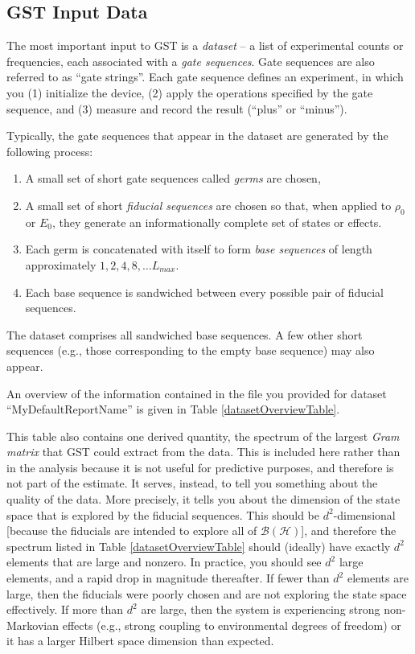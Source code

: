 \documentclass{article}[11pt]
\begin{document}
\subsection{GST Input Data}

The most important input to GST is a \emph{dataset} -- a list of experimental counts or frequencies, each associated with a \emph{gate sequences}.  Gate sequences are also referred to as ``gate strings''.  Each gate sequence defines an experiment, in which you (1) initialize the device, (2) apply the operations specified by the gate sequence, and (3) measure and record the result (``plus'' or ``minus'').

Typically, the gate sequences that appear in the dataset are generated by the following process:
\begin{enumerate}
\item A small set of short gate sequences called \emph{germs} are chosen,
\item A small set of short \emph{fiducial sequences} are chosen so that, when applied to $\rho_0$ or $E_0$, they generate an informationally complete set of states or effects.
\item Each germ is concatenated with itself to form \emph{base sequences} of length approximately $1,2,4,8,\ldots L_{max}$.
\item Each base sequence is sandwiched between every possible pair of fiducial sequences.
\end{enumerate}
The dataset comprises all sandwiched base sequences.  A few other short sequences (e.g., those corresponding to the empty base sequence) may also appear.

\iftoggle{LsAndGermsSet}{ The fiducial sequences and germs for \emph{this} dataset are given in Table \ref{fiducialAndGermListTables}. }{ Fiducial sequence and germ information was not given for this report, and may not be applicable.}  An overview of the information contained in the file you provided for dataset ``MyDefaultReportName'' is given in Table \ref{datasetOverviewTable}.  

This table also contains one derived quantity, the spectrum of the largest \emph{Gram matrix} that GST could extract from the data.  This is included here rather than in the analysis because it is not useful for predictive purposes, and therefore is not part of the estimate.  It serves, instead, to tell you something about the quality of the data.  More precisely, it tells you about the dimension of the state space that is explored by the fiducial sequences.  This should be $d^2$-dimensional [because the fiducials are intended to explore all of $\mathcal{B}(\mathcal{H})$], and therefore the spectrum listed in Table \ref{datasetOverviewTable} should (ideally) have exactly $d^2$ elements that are large and nonzero.  In practice, you should see $d^2$ large elements, and a rapid drop in magnitude thereafter.  If fewer than $d^2$ elements are large, then the fiducials were poorly chosen and are not exploring the state space effectively.  If more than $d^2$ are large, then the system is experiencing strong non-Markovian effects (e.g., strong coupling to environmental degrees of freedom) or it has a larger Hilbert space dimension than expected.
\end{document}
